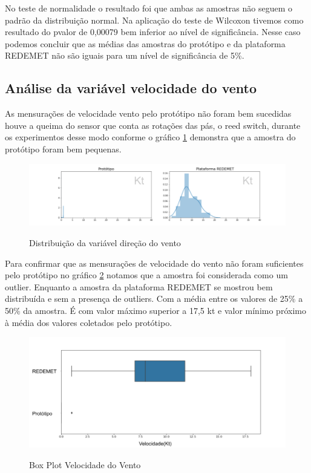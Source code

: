 No teste de normalidade o resultado foi que ambas as amostras não seguem o padrão da distribuição normal. Na aplicação do teste de Wilcoxon tivemos como resultado do pvalor de 0,00079 bem inferior ao nível de significância. Nesse caso podemos concluir que as médias das amostras do protótipo e da plataforma REDEMET não são iguais para um nível de significância de 5\%.

\subsection{Análise da variável velocidade do vento}

As mensurações de velocidade vento pelo protótipo não foram bem sucedidas houve a queima do sensor que conta as rotações das pás, o reed switch, durante os experimentos desse modo conforme o gráfico \ref{fig:dist_velvento} demonstra que a amostra do protótipo foram bem pequenas. 

\begin{figure} [!h]
    \centering
    \caption{Distribuição da variável direção do vento}    \includegraphics [scale = 0.5] {Figuras/dist_velvento.png}
    \label{fig:dist_velvento}
\end{figure}


Para confirmar que as mensurações de velocidade do vento não foram suficientes pelo protótipo no gráfico \ref{fig:box_plot_velvento} notamos que a amostra foi considerada como um outlier. Enquanto a amostra da plataforma REDEMET se mostrou bem distribuída e sem a presença de outliers. Com a média entre os valores de 25\% a 50\% da amostra. É com valor máximo superior a 17,5 kt e valor mínimo próximo à média dos valores coletados pelo protótipo.

\begin{figure} [!h]
    \centering
    \caption{Box Plot Velocidade do Vento}
    \includegraphics [scale = 0.5] {Figuras/box_plot_vento.png}
    \label{fig:box_plot_velvento}
\end{figure}

